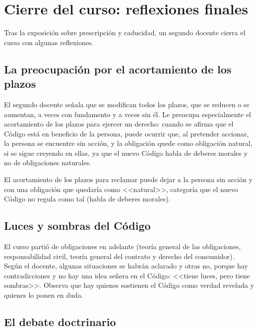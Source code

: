 \documentclass[12pt,oneside]{book}
\begin{document}
\chapter{Cierre del curso: reflexiones finales}

Tras la exposici\'on sobre prescripci\'on y caducidad, un segundo docente cierra el curso con algunas reflexiones.

\section{La preocupaci\'on por el acortamiento de los plazos}

El segundo docente se\~nala que se modifican todos los plazos, que se reducen o se aumentan, a veces con fundamento y a veces sin \'el. Le preocupa especialmente el acortamiento de los plazos para ejercer un derecho: cuando se afirma que el C\'odigo est\'a en beneficio de la persona, puede ocurrir que, al pretender accionar, la persona se encuentre sin acci\'on, y la obligaci\'on quede como obligaci\'on natural, si se sigue creyendo en ellas, ya que el nuevo C\'odigo habla de deberes morales y no de obligaciones naturales.

\begin{important}
El acortamiento de los plazos para reclamar puede dejar a la persona sin acci\'on y con una obligaci\'on que quedar\'ia como <<natural>>, categor\'ia que el nuevo C\'odigo no regula como tal (habla de deberes morales).
\end{important}

\section{Luces y sombras del C\'odigo}

El curso parti\'o de obligaciones en adelante (teor\'ia general de las obligaciones, responsabilidad civil, teor\'ia general del contrato y derecho del consumidor). Seg\'un el docente, algunas situaciones se habr\'an aclarado y otras no, porque hay contradicciones y no hay una idea se\~nera en el C\'odigo: <<tiene luces, pero tiene sombras>>. Observa que hay quienes sostienen el C\'odigo como verdad revelada y quienes lo ponen en duda.

\section{El debate doctrinario}
\end{document}
